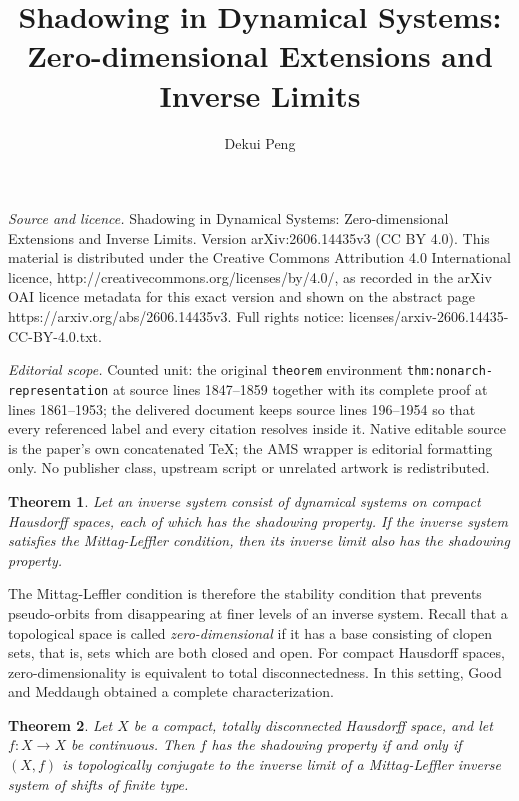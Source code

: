 \documentclass[10pt,a4paper]{amsart}
\newtheorem{theorem}{Theorem}[section]
\numberwithin{equation}{section}
\begin{document}
\title[Shadowing in Dynamical Systems: Zero-dimensional Extensions ]{Shadowing in Dynamical Systems: Zero-dimensional Extensions and Inverse Limits}
\author{Dekui Peng}
\date{}
\maketitle
\noindent\emph{Source and licence.} Shadowing in Dynamical Systems: Zero-dimensional Extensions and Inverse Limits. Version arXiv:2606.14435v3 (CC BY 4.0). This material is distributed under the Creative Commons Attribution 4.0 International licence, http://creativecommons.org/licenses/by/4.0/, as recorded in the arXiv OAI licence metadata for this exact version and shown on the abstract page https://arxiv.org/abs/2606.14435v3. Full rights notice: licenses/arxiv-2606.14435-CC-BY-4.0.txt.\par\smallskip
\noindent\textit{Editorial scope.} Counted unit: the original \texttt{theorem} environment \texttt{thm:nonarch-representation} at source lines 1847--1859 together with its complete proof at lines 1861--1953; the delivered document keeps source lines 196--1954 so that every referenced label and every citation resolves inside it. Native editable source is the paper's own concatenated TeX; the AMS wrapper is editorial formatting only. No publisher class, upstream script or unrelated artwork is redistributed.
\begin{theorem}\cite[Theorem 8]{GM}\label{thm:GM8}
Let an inverse system consist of dynamical systems on compact Hausdorff spaces,
each of which has the shadowing property. If the inverse system satisfies the
Mittag-Leffler condition, then its inverse limit also has the shadowing property.
\end{theorem}

The Mittag-Leffler condition is therefore the stability condition that prevents
pseudo-orbits from disappearing at finer levels of an inverse system. Recall
that a topological space is called \emph{zero-dimensional} if it has a base
consisting of clopen sets, that is, sets which are both closed and open. For
compact Hausdorff spaces, zero-dimensionality is equivalent to total
disconnectedness. In this setting, Good and Meddaugh obtained a complete
characterization.


\begin{theorem}\cite[Theorem 18]{GM}\label{thm:GM18}
Let $X$ be a compact, totally disconnected Hausdorff space, and let
$f:X\to X$ be continuous. Then $f$ has the shadowing property if and only if
$(X,f)$ is topologically conjugate to the inverse limit of a Mittag-Leffler
inverse system of shifts of finite type.
\end{theorem}
\end{document}
